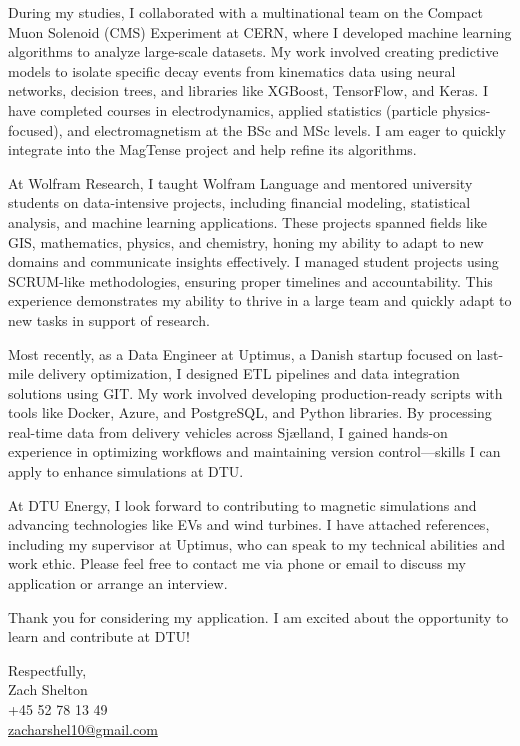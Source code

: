 \documentclass[11pt,a4]{article}
\begin{document}
During my studies, I collaborated with a multinational team on the Compact Muon Solenoid (CMS) Experiment at CERN, where I developed machine learning algorithms to analyze large-scale datasets. My work involved creating predictive models to isolate specific decay events from kinematics data using neural networks, decision trees, and libraries like XGBoost, TensorFlow, and Keras. I have completed courses in electrodynamics, applied statistics (particle physics-focused), and electromagnetism at the BSc and MSc levels. I am eager to quickly integrate into the MagTense project and help refine its algorithms.

At Wolfram Research, I taught Wolfram Language and mentored university students on data-intensive projects, including financial modeling, statistical analysis, and machine learning applications. These projects spanned fields like GIS, mathematics, physics, and chemistry, honing my ability to adapt to new domains and communicate insights effectively. I managed student projects using SCRUM-like methodologies, ensuring proper timelines and accountability. This experience demonstrates my ability to thrive in a large team and quickly adapt to new tasks in support of research.

Most recently, as a Data Engineer at Uptimus, a Danish startup focused on last-mile delivery optimization, I designed ETL pipelines and data integration solutions using GIT. My work involved developing production-ready scripts with tools like Docker, Azure, and PostgreSQL, and Python libraries. By processing real-time data from delivery vehicles across Sjælland, I gained hands-on experience in optimizing workflows and maintaining version control—skills I can apply to enhance simulations at DTU.

At DTU Energy, I look forward to contributing to magnetic simulations and advancing technologies like EVs and wind turbines. I have attached references, including my supervisor at Uptimus, who can speak to my technical abilities and work ethic. Please feel free to contact me via phone or email to discuss my application or arrange an interview.

Thank you for considering my application. I am excited about the opportunity to learn and contribute at DTU!

\vspace{0.5cm}
\raggedright
Respectfully, \\ Zach Shelton \\ +45 52 78 13 49 \\ 
\href{mailto:zshelton1997@gmail.com}{zacharshel10@gmail.com} 
\end{document}
